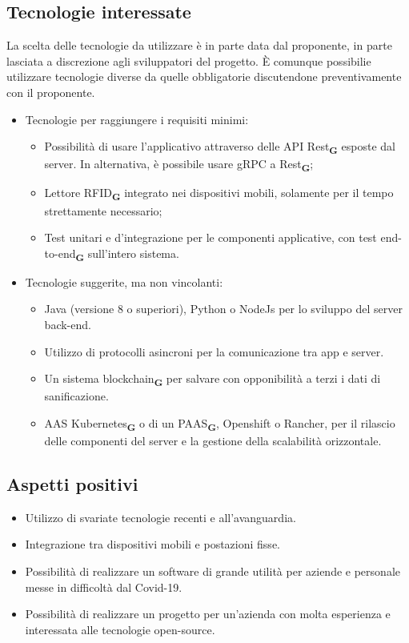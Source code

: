 \subsection{Tecnologie interessate}
La scelta delle tecnologie da utilizzare è in parte data dal proponente, in parte lasciata a discrezione agli sviluppatori del progetto.
È comunque possibilie utilizzare tecnologie diverse da quelle obbligatorie discutendone preventivamente con il proponente.
\begin{itemize}
    \item Tecnologie per raggiungere i requisiti minimi:
    \begin{itemize}
        \item Possibilità di usare l'applicativo attraverso delle API Rest\textsubscript{\textbf{G}} esposte dal server. In alternativa, è possibile usare gRPC a Rest\textsubscript{\textbf{G}};
        \item Lettore RFID\textsubscript{\textbf{G}} integrato nei dispositivi mobili, solamente per il tempo strettamente necessario;
        \item Test unitari e d'integrazione per le componenti applicative, con test end-to-end\textsubscript{\textbf{G}} sull'intero sistema. 
    \end{itemize}
    \item Tecnologie suggerite, ma non vincolanti:
    \begin{itemize}
        \item Java (versione 8 o superiori), Python o NodeJs per lo sviluppo del server back-end.
        \item Utilizzo di protocolli asincroni per la comunicazione tra app e server.
        \item Un sistema blockchain\textsubscript{\textbf{G}} per salvare con opponibilità a terzi i dati di sanificazione.
        \item AAS Kubernetes\textsubscript{\textbf{G}} o di un PAAS\textsubscript{\textbf{G}}, Openshift o Rancher, per il rilascio delle componenti del server e la gestione della scalabilità orizzontale.
    \end{itemize}
\end{itemize}

\subsection{Aspetti positivi}
\begin{itemize}
    \item Utilizzo di svariate tecnologie recenti e all'avanguardia.
    \item Integrazione tra dispositivi mobili e postazioni fisse.
    \item Possibilità di realizzare un software di grande utilità per aziende e personale messe in difficoltà dal Covid-19.
    \item Possibilità di realizzare un progetto per un'azienda con molta esperienza e interessata alle tecnologie open-source.
\end{itemize}

